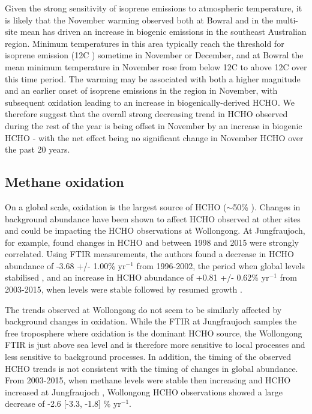 \documentclass[draft,linenumbers]{AGUJournal}
\begin{document}
Given the strong sensitivity of isoprene emissions to atmospheric temperature, it is likely that the November warming observed both at Bowral and in the multi-site mean has driven an increase in biogenic emissions in the southeast Australian region. Minimum temperatures in this area typically reach the threshold for isoprene emission (12\degree C \citep{Oku2014}) sometime in November or December, and at Bowral the mean minimum temperature in November rose from below 12\degree C to above 12\degree C over this time period. The warming may be associated with both a higher magnitude and an earlier onset of isoprene emissions in the region in November, with subsequent oxidation leading to an increase in biogenically-derived HCHO. We therefore suggest that the overall strong decreasing trend in HCHO observed during the rest of the year is being offset in November by an increase in biogenic HCHO - with the net effect being no significant change in November HCHO over the past 20 years.

\subsection{Methane oxidation}
On a global scale,  oxidation is the largest source of HCHO ($\sim$50\% \citep{Pfister2008}). Changes in background  abundance have been shown to affect HCHO observed at other sites and could be impacting the HCHO observations at Wollongong. At Jungfraujoch, for example, \citet{Franco2016} found changes in HCHO and  between 1998 and 2015 were strongly correlated. Using FTIR measurements, the authors found a decrease in HCHO abundance of -3.68 +/- 1.00\% yr$^{-1}$ from 1996-2002, the period when global  levels stabilised \citep{Dlugokencky2003,Aydin2011,Simpson2012}, and an increase in HCHO abundance of +0.81 +/- 0.62\% yr$^{-1}$ from 2003-2015, when  levels were stable followed by resumed growth \citep{Kirschke2013,Nisbet2014}.

The trends observed at Wollongong do not seem to be similarly affected by background changes in  oxidation. While the FTIR at Jungfraujoch samples the free troposphere where  oxidation is the dominant HCHO source, the Wollongong FTIR is just above sea level and is therefore more sensitive to local processes and less sensitive to background processes. In addition, the timing of the observed HCHO trends is not consistent with the timing of changes in global  abundance. From 2003-2015, when methane levels were stable then increasing \citep{Nisbet2014} and HCHO increased at Jungfraujoch \citep{Franco2016}, Wollongong HCHO observations showed a large decrease of -2.6 [-3.3, -1.8] \% yr$^{-1}$.
\end{document}
